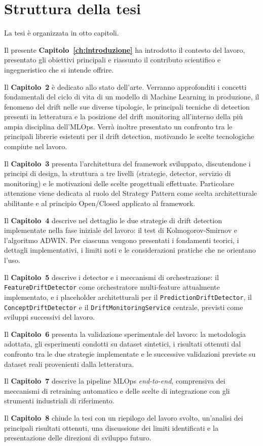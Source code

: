 \section{Struttura della tesi}
\label{sec:struttura}

La tesi è organizzata in otto capitoli.

Il presente \textbf{Capitolo~\ref{ch:introduzione}} ha introdotto il contesto
del lavoro, presentato gli obiettivi principali e riassunto il contributo
scientifico e ingegneristico che si intende offrire.

Il \textbf{Capitolo~2} è dedicato allo stato dell'arte. Verranno approfonditi
i concetti fondamentali del ciclo di vita di un modello di Machine Learning in
produzione, il fenomeno del drift nelle sue diverse tipologie, le principali
tecniche di detection presenti in letteratura e la posizione del drift
monitoring all'interno della più ampia disciplina dell'MLOps. Verrà inoltre
presentato un confronto tra le principali librerie esistenti per il drift
detection, motivando le scelte tecnologiche compiute nel lavoro.

Il \textbf{Capitolo~3} presenta l'architettura del framework sviluppato,
discutendone i principi di design, la struttura a tre livelli (strategie,
detector, servizio di monitoring) e le motivazioni delle scelte progettuali
effettuate. Particolare attenzione viene dedicata al ruolo del Strategy Pattern
come scelta architetturale abilitante e al principio Open/Closed applicato al
framework.

Il \textbf{Capitolo~4} descrive nel dettaglio le due strategie di drift
detection implementate nella fase iniziale del lavoro: il test di
Kolmogorov-Smirnov e l'algoritmo ADWIN. Per ciascuna vengono presentati i
fondamenti teorici, i dettagli implementativi, i limiti noti e le
considerazioni pratiche che ne orientano l'uso.

Il \textbf{Capitolo~5} descrive i detector e i meccanismi di orchestrazione: il
\texttt{FeatureDriftDetector} come orchestratore multi-feature attualmente
implementato, e i placeholder architetturali per il
\texttt{PredictionDriftDetector}, il \texttt{ConceptDriftDetector} e il
\texttt{DriftMonitoringService} centrale, previsti come sviluppi successivi
del lavoro.

Il \textbf{Capitolo~6} presenta la validazione sperimentale del lavoro: la
metodologia adottata, gli esperimenti condotti su dataset sintetici, i
risultati ottenuti dal confronto tra le due strategie implementate e le
successive validazioni previste su dataset reali provenienti dalla letteratura.

Il \textbf{Capitolo~7} descrive la pipeline MLOps \textit{end-to-end},
comprensiva dei meccanismi di retraining automatico e delle scelte di
integrazione con gli strumenti industriali di riferimento.

Il \textbf{Capitolo~8} chiude la tesi con un riepilogo del lavoro svolto,
un'analisi dei principali risultati ottenuti, una discussione dei limiti
identificati e la presentazione delle direzioni di sviluppo futuro.
